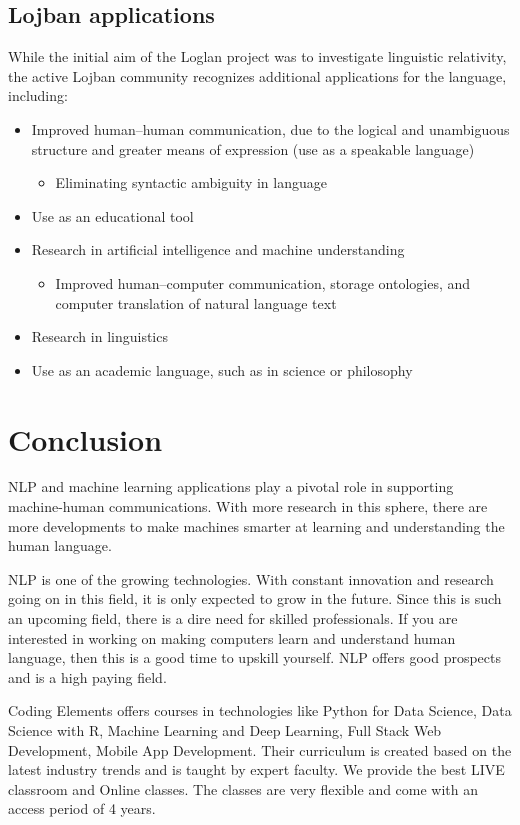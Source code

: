 \documentclass[11pt]{article}
\begin{document}
\subsection{Lojban applications}
\label{sec:org08ed496}
While the initial aim of the Loglan project was to investigate linguistic relativity,
the active Lojban community recognizes additional applications for the language,
including:
\begin{itemize}
\item Improved human–human communication, due to the logical and unambiguous structure
and greater means of expression (use as a speakable language)
\begin{itemize}
\item Eliminating syntactic ambiguity in language
\end{itemize}
\item Use as an educational tool
\item Research in artificial intelligence and machine understanding
\begin{itemize}
\item Improved human–computer communication, storage ontologies, and computer
translation of natural language text
\end{itemize}
\item Research in linguistics
\item Use as an academic language, such as in science or philosophy
\end{itemize}
\clearpage

\section{Conclusion}
\label{sec:orgd89513c}
NLP and machine learning applications play a pivotal role in supporting machine-human
communications. With more research in this sphere, there are more developments to make
machines smarter at learning and understanding the human language.

NLP is one of the growing technologies. With constant innovation and research going
on in this field, it is only expected to grow in the future. Since this is such an
upcoming field, there is a dire need for skilled professionals. If you are interested
in working on making computers learn and understand human language, then this is a
good time to upskill yourself. NLP offers good prospects and is a high paying field.

Coding Elements offers courses in technologies like Python for Data Science, Data
Science with R, Machine Learning and Deep Learning, Full Stack Web Development, Mobile
App Development. Their curriculum is created based on the latest industry trends and
is taught by expert faculty. We provide the best LIVE classroom and Online classes.
The classes are very flexible and come with an access period of 4 years.
\clearpage
\end{document}
